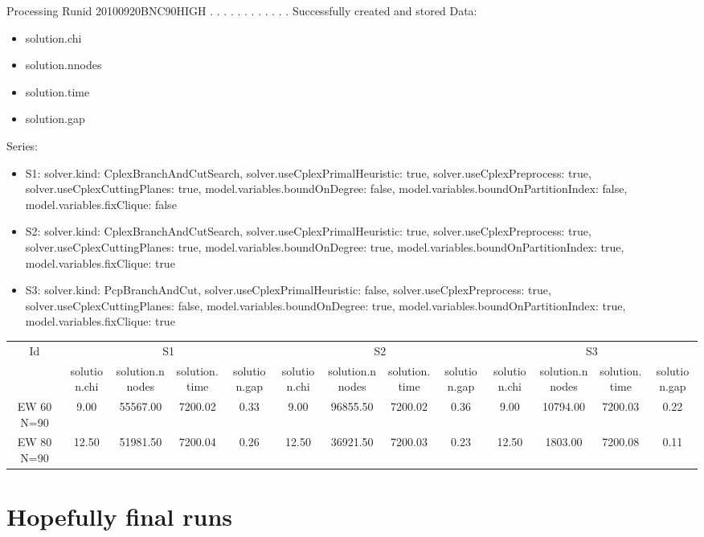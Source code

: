 \documentclass[landscape, 12pt]{report}
\begin{document}
 
Processing Runid 20100920BNC90HIGH
. . . . . . . . . . . .  Successfully created and stored
Data:
\begin{itemize}
\item solution.chi
\item solution.nnodes
\item solution.time
\item solution.gap
\end{itemize}
Series:
\begin{itemize}
\item S1: solver.kind: CplexBranchAndCutSearch, solver.useCplexPrimalHeuristic: true, solver.useCplexPreprocess: true, solver.useCplexCuttingPlanes: true, model.variables.boundOnDegree: false, model.variables.boundOnPartitionIndex: false, model.variables.fixClique: false
\item S2: solver.kind: CplexBranchAndCutSearch, solver.useCplexPrimalHeuristic: true, solver.useCplexPreprocess: true, solver.useCplexCuttingPlanes: true, model.variables.boundOnDegree: true, model.variables.boundOnPartitionIndex: true, model.variables.fixClique: true
\item S3: solver.kind: PcpBranchAndCut, solver.useCplexPrimalHeuristic: false, solver.useCplexPreprocess: true, solver.useCplexCuttingPlanes: false, model.variables.boundOnDegree: true, model.variables.boundOnPartitionIndex: true, model.variables.fixClique: true
\end{itemize}
\begin{tabular}{|c|cccc|cccc|cccc|}
\hline
\multicolumn{1}{|c|}{Id} & \multicolumn{4}{|c|}{S1} & \multicolumn{4}{|c|}{S2} & \multicolumn{4}{|c|}{S3}
\\
 & solution.chi & solution.nnodes & solution.time & solution.gap & solution.chi & solution.nnodes & solution.time & solution.gap & solution.chi & solution.nnodes & solution.time & solution.gap
\\
\hline
EW 60 N=90 & 9.00 & 55567.00 & 7200.02 & 0.33 & 9.00 & 96855.50 & 7200.02 & 0.36 & 9.00 & 10794.00 & 7200.03 & 0.22
\\
EW 80 N=90 & 12.50 & 51981.50 & 7200.04 & 0.26 & 12.50 & 36921.50 & 7200.03 & 0.23 & 12.50 & 1803.00 & 7200.08 & 0.11
\\
\hline 
 \end{tabular}

	
	\clearpage
	
	\section{Hopefully final runs}
	
\end{document}
